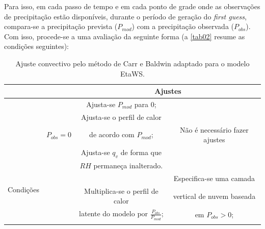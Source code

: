 Para isso, em cada passo de tempo e em cada ponto de grade onde as observações de precipitação estão disponíveis, durante o período de geração do \textit{first guess}, compara-se a precipitação prevista ($P_{mod}$) com a precipitação observada ($P_{obs}$). Com isso, procede-se a uma avaliação da seguinte forma (a \autoref{tab02} resume as condições seguintes):

\begin{table}
\caption{Ajuste convectivo pelo método de Carr e Baldwin adaptado para o modelo EtaWS.}
\label{tab02}
\centering
\begin{tabular}{|c|c|c|c|}
\cline{3-4} 
\multicolumn{1}{c}{} &  & \multicolumn{2}{c|}{Ajustes}\tabularnewline
\hline 
\begin{sideways}

\end{sideways} &  & Ajusta-se $P_{mod}$ para 0; & \tabularnewline
\begin{sideways}

\end{sideways} &  & Ajusta-se o perfil de calor & \tabularnewline
\begin{sideways}

\end{sideways} & $P_{obs}=0$ & de acordo com $P_{mod}$; & Não é necessário fazer ajustes\tabularnewline
\begin{sideways}

\end{sideways} &  & Ajusta-se $q_{v}$ de forma que & \tabularnewline
\begin{sideways}

\end{sideways} &  & $RH$ permaneça inalterado. & \tabularnewline
\cline{2-4} 
\multirow{2}{0pt}{\begin{sideways}Condições\end{sideways}}
\begin{sideways}

\end{sideways} &  &  & Especifica-se uma camada\tabularnewline
 
\begin{sideways}

\end{sideways} &  & Multiplica-se o perfil de calor & vertical de nuvem baseada\tabularnewline
\begin{sideways}

\end{sideways} &  & latente do modelo por $\frac{P_{obs}}{P_{mod}}$; & em $P_{obs}>0$;\tabularnewline
\begin{sideways}


\end{sideways}
\end{tabular}
\end{table}
